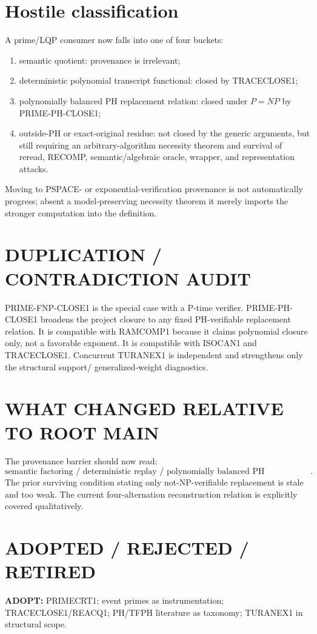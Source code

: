 \documentclass[11pt]{article}
\begin{document}
\section*{Hostile classification}
A prime/LQP consumer now falls into one of four buckets:
\begin{enumerate}
\item semantic quotient: provenance is irrelevant;
\item deterministic polynomial transcript functional: closed by TRACECLOSE1;
\item polynomially balanced PH replacement relation: closed under \(P=NP\) by PRIME-PH-CLOSE1;
\item outside-PH or exact-original residue: not closed by the generic arguments, but still requiring
an arbitrary-algorithm necessity theorem and survival of reread, RECOMP, semantic/algebraic oracle,
wrapper, and representation attacks.
\end{enumerate}
Moving to PSPACE- or exponential-verification provenance is not automatically progress; absent a
model-preserving necessity theorem it merely imports the stronger computation into the definition.

\section*{DUPLICATION / CONTRADICTION AUDIT}
PRIME-FNP-CLOSE1 is the special case with a P-time verifier. PRIME-PH-CLOSE1 broadens the project
closure to any fixed PH-verifiable replacement relation. It is compatible with RAMCOMP1 because it
claims polynomial closure only, not a favorable exponent. It is compatible with ISOCAN1 and
TRACECLOSE1. Concurrent TURANEX1 is independent and strengthens only the structural support/
generalized-weight diagnostics.

\section*{WHAT CHANGED RELATIVE TO ROOT MAIN}
The provenance barrier should now read:
\[
\boxed{\text{semantic factoring / deterministic replay / polynomially balanced PH replacement search}.}
\]
The prior surviving condition stating only not-NP-verifiable replacement is stale and too weak.
The current four-alternation reconstruction relation is explicitly covered qualitatively.

\section*{ADOPTED / REJECTED / RETIRED}
\textbf{ADOPT:} PRIMECRT1; event primes as instrumentation; TRACECLOSE1/REACQ1;
PH/TFPH literature as taxonomy; TURANEX1 in structural scope.
\end{document}
